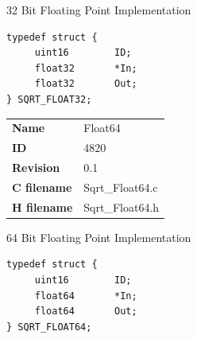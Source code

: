 32 Bit Floating Point Implementation

\begin{lstlisting}
typedef struct {
     uint16        ID;
     float32       *In;
     float32       Out;
} SQRT_FLOAT32;
\end{lstlisting}

\ifdefined \AddTestReports
{}
\fi
{}
\nopagebreak[0]
\begin{tabular}{l l}
\textbf{Name} & Float64 \tabularnewline
\textbf{ID} & 4820 \tabularnewline
\textbf{Revision} & 0.1 \tabularnewline
\textbf{C filename} & Sqrt\_Float64.c \tabularnewline
\textbf{H filename} & Sqrt\_Float64.h \tabularnewline
\end{tabular}
\vspace{1ex}

64 Bit Floating Point Implementation

\begin{lstlisting}
typedef struct {
     uint16        ID;
     float64       *In;
     float64       Out;
} SQRT_FLOAT64;
\end{lstlisting}

\ifdefined \AddTestReports
{}
\fi
